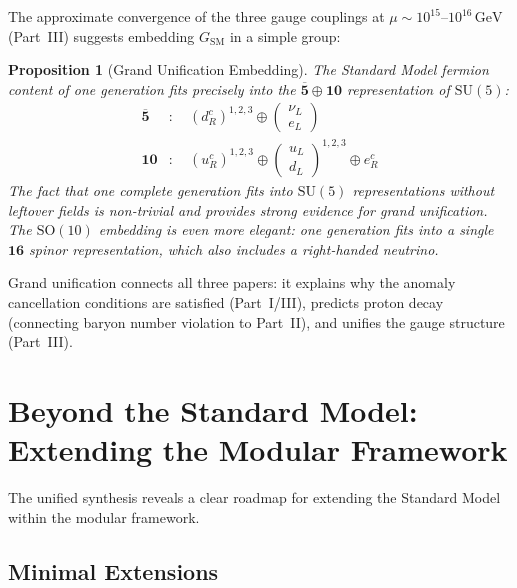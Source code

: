 \documentclass[12pt]{article}
\newtheorem{proposition}[theorem]{Proposition}
\theoremstyle{definition}
\theoremstyle{remark}
\newcommand{\GeV}{\,\mathrm{GeV}}
\newcommand{\su}[1]{\mathrm{SU}(#1)}
\begin{document}
The approximate convergence of the three gauge couplings at $\mu \sim 10^{15}$--$10^{16}\GeV$ (Part~III) suggests embedding $G_{\mathrm{SM}}$ in a simple group:

\begin{proposition}[Grand Unification Embedding]
\label{prop:gut-embedding}
The Standard Model fermion content of one generation fits precisely into the $\overline{\mathbf{5}} \oplus \mathbf{10}$ representation of $\su{5}$:
\begin{align}
\overline{\mathbf{5}} &: \quad (d_R^c)^{1,2,3} \oplus \begin{pmatrix} \nu_L \\ e_L \end{pmatrix} \\
\mathbf{10} &: \quad (u_R^c)^{1,2,3} \oplus \begin{pmatrix} u_L \\ d_L \end{pmatrix}^{1,2,3} \oplus e_R^c
\end{align}
The fact that one complete generation fits into $\su{5}$ representations without leftover fields is non-trivial and provides strong evidence for grand unification. The $\mathrm{SO}(10)$ embedding is even more elegant: one generation fits into a single $\mathbf{16}$ spinor representation, which also includes a right-handed neutrino.
\end{proposition}

Grand unification connects all three papers: it explains why the anomaly cancellation conditions are satisfied (Part~I/III), predicts proton decay (connecting baryon number violation to Part~II), and unifies the gauge structure (Part~III).


\section{Beyond the Standard Model: Extending the Modular Framework}
\label{sec:beyond}

The unified synthesis reveals a clear roadmap for extending the Standard Model within the modular framework.

\subsection{Minimal Extensions}
\end{document}
